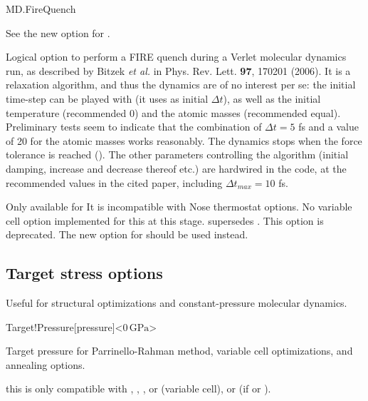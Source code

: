 \begin{fdflogicalF}{MD.FireQuench}
  
  See the new option  for .

  Logical option to perform a FIRE quench during a Verlet molecular
  dynamics run, as described by Bitzek \textit{et al.} in
  Phys. Rev. Lett. \textbf{97}, 170201 (2006). It is a relaxation
  algorithm, and thus the dynamics are of no interest per se: the
  initial time-step can be played with (it uses
   as initial $\Delta t$), as well as the
  initial temperature (recommended 0) and the atomic masses
  (recommended equal). Preliminary tests seem to indicate that the
  combination of $\Delta t = 5$ fs and a value of 20 for the atomic
  masses works reasonably. The dynamics stops when the force tolerance
  is reached (). The other parameters
  controlling the algorithm (initial damping, increase and decrease
  thereof etc.) are hardwired in the code, at the recommended values
  in the cited paper, including $\Delta t_{max} = 10$ fs.

  Only available for 
  It is incompatible with Nose thermostat options. No variable
  cell option implemented for this at this stage.
   supersedes . This option is
  deprecated. The new option  for  should be
  used instead.

\end{fdflogicalF}


\fi


\subsection{Target stress options}

Useful for structural optimizations and constant-pressure molecular
dynamics.

\begin{fdfentry}{Target!Pressure}[pressure]<$0\,\mathrm{GPa}$>
  
  Target pressure for Parrinello-Rahman method, variable cell
  optimizations, and annealing options.

  \note this is only compatible with 
   , ,
  ,  or  (variable cell), or 
  (if   or ).
  
\end{fdfentry}


